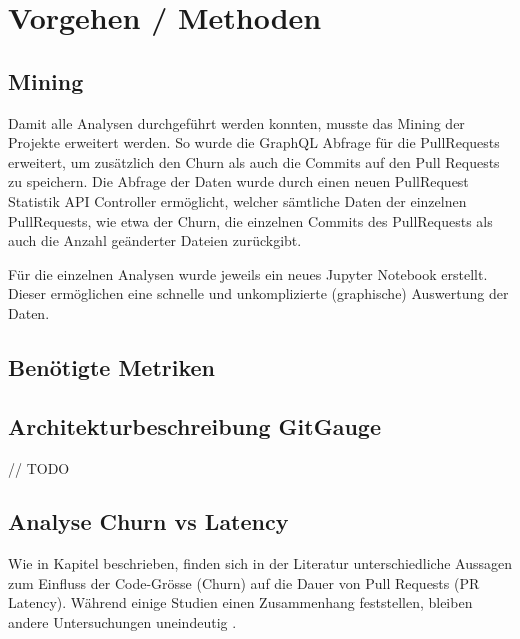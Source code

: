 


\chapter{Vorgehen / Methoden} %

\label{Chapter3} %


\section{Mining}
Damit alle Analysen durchgeführt werden konnten, musste das Mining der Projekte erweitert werden. So wurde die GraphQL Abfrage für die PullRequests erweitert, um zusätzlich den Churn als auch die Commits auf den Pull Requests zu speichern. Die Abfrage der Daten wurde durch einen neuen PullRequest Statistik API Controller ermöglicht, welcher sämtliche Daten der einzelnen PullRequests, wie etwa der Churn, die einzelnen Commits des PullRequests als auch die Anzahl geänderter Dateien zurückgibt. 

Für die einzelnen Analysen wurde jeweils ein neues Jupyter Notebook erstellt. Dieser ermöglichen eine schnelle und unkomplizierte (graphische) Auswertung der Daten. \parencite{stumpf_simon_repo-detectivesba-metric-analysis-scripts_nodate}

\section{Benötigte Metriken}


\section{Architekturbeschreibung GitGauge}
// TODO 

\section{Analyse Churn vs Latency}
\label{sec:Metriken}
Wie in Kapitel  beschrieben, finden sich in der Literatur unterschiedliche Aussagen zum Einfluss der Code-Grösse (Churn) auf die Dauer von Pull Requests (PR Latency). Während einige Studien einen Zusammenhang feststellen, bleiben andere Untersuchungen uneindeutig \parencite{hasan_understanding_2023}\parencite{kudrjavets_small_2022}.

